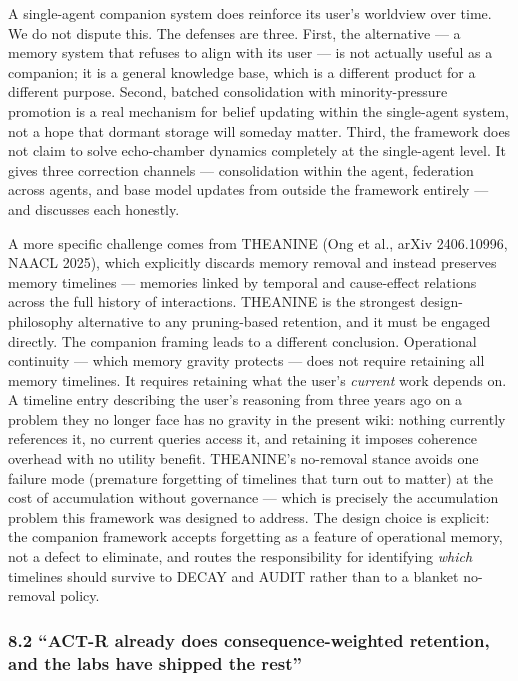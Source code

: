 \documentclass[
  11pt,
]{article}
\begin{document}
A single-agent companion system does reinforce its user's worldview over
time. We do not dispute this. The defenses are three. First, the
alternative --- a memory system that refuses to align with its user ---
is not actually useful as a companion; it is a general knowledge base,
which is a different product for a different purpose. Second, batched
consolidation with minority-pressure promotion is a real mechanism for
belief updating within the single-agent system, not a hope that dormant
storage will someday matter. Third, the framework does not claim to
solve echo-chamber dynamics completely at the single-agent level. It
gives three correction channels --- consolidation within the agent,
federation across agents, and base model updates from outside the
framework entirely --- and discusses each honestly.

A more specific challenge comes from THEANINE (Ong et al., arXiv
2406.10996, NAACL 2025), which explicitly discards memory removal and
instead preserves memory timelines --- memories linked by temporal and
cause-effect relations across the full history of interactions. THEANINE
is the strongest design-philosophy alternative to any pruning-based
retention, and it must be engaged directly. The companion framing leads
to a different conclusion. Operational continuity --- which memory
gravity protects --- does not require retaining all memory timelines. It
requires retaining what the user's \emph{current} work depends on. A
timeline entry describing the user's reasoning from three years ago on a
problem they no longer face has no gravity in the present wiki: nothing
currently references it, no current queries access it, and retaining it
imposes coherence overhead with no utility benefit. THEANINE's
no-removal stance avoids one failure mode (premature forgetting of
timelines that turn out to matter) at the cost of accumulation without
governance --- which is precisely the accumulation problem this
framework was designed to address. The design choice is explicit: the
companion framework accepts forgetting as a feature of operational
memory, not a defect to eliminate, and routes the responsibility for
identifying \emph{which} timelines should survive to DECAY and AUDIT
rather than to a blanket no-removal policy.

\hypertarget{act-r-already-does-consequence-weighted-retention-and-the-labs-have-shipped-the-rest}{%
\subsubsection{8.2 ``ACT-R already does consequence-weighted retention,
and the labs have shipped the
rest''}\label{act-r-already-does-consequence-weighted-retention-and-the-labs-have-shipped-the-rest}}
\end{document}
